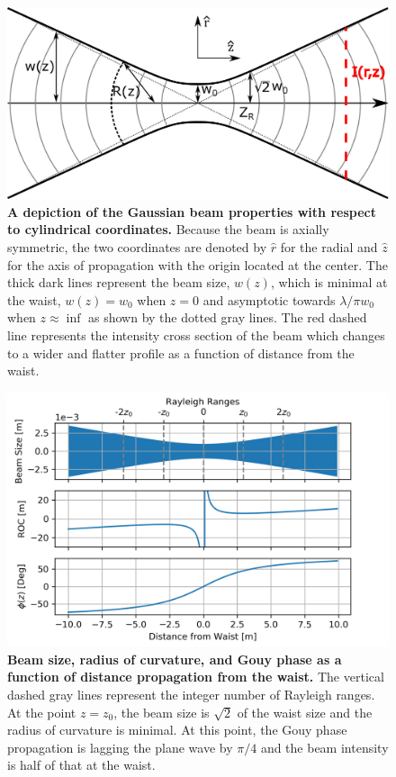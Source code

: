 		\begin{figure}[ht]
			\centering
			\includegraphics[width=0.65 \textwidth]{../Figures/GaussProfile.png}
			\caption[A depiction of the Gaussian beam properties with respect to cylindrical coordinates.]
			{\textbf{A depiction of the Gaussian beam properties with respect to cylindrical coordinates.} Because the beam is axially symmetric, the two coordinates are denoted by $\hat{r}$ for the radial and $\hat{z}$ for the axis of propagation with the origin located at the center. The thick dark lines represent the beam size, $w(z)$, which is minimal at the waist, $w(z)=w_0$ when $z=0$ and asymptotic towards $\lambda/\pi w_0$ when $z \approx \inf$ as shown by the dotted gray lines. The red dashed line represents the intensity cross section of the beam which changes to a wider and flatter profile as a function of distance from the waist.}
			\label{fig:GaussProfile}
		\end{figure}
	
		\begin{figure}[ht]
			\centering
			\includegraphics[width=0.6 \textwidth]{../Figures/GaussBeamParams.png}
			\caption[Beam size, radius of curvature, and Gouy phase as a function of distance propagation from the waist.] 
			{\textbf{Beam size, radius of curvature, and Gouy phase as a function of distance propagation from the waist.} The vertical dashed gray lines represent the integer number of Rayleigh ranges.  At the point $z=z_0$, the beam size is $\sqrt{2}$ of the waist size and the radius of curvature is minimal.  At this point, the Gouy phase propagation is lagging the plane wave by $\pi /4$ and the beam intensity is half of that at the waist.}
			\label{fig:GaussParams}
		\end{figure}

